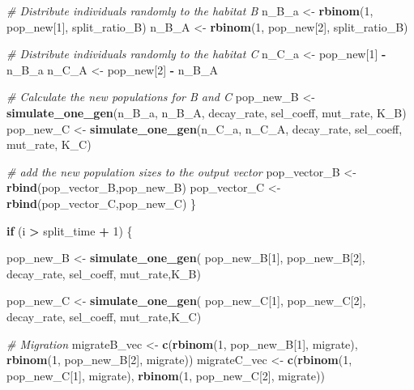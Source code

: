 \documentclass[
]{article}
\newenvironment{Shaded}{\begin{snugshade}}{\end{snugshade}}
\newcommand{\CommentTok}[1]{\textcolor[rgb]{0.56,0.35,0.01}{\textit{#1}}}
\newcommand{\ControlFlowTok}[1]{\textcolor[rgb]{0.13,0.29,0.53}{\textbf{#1}}}
\newcommand{\DecValTok}[1]{\textcolor[rgb]{0.00,0.00,0.81}{#1}}
\newcommand{\FunctionTok}[1]{\textcolor[rgb]{0.13,0.29,0.53}{\textbf{#1}}}
\newcommand{\NormalTok}[1]{#1}
\newcommand{\OtherTok}[1]{\textcolor[rgb]{0.56,0.35,0.01}{#1}}
\newcommand{\SpecialCharTok}[1]{\textcolor[rgb]{0.81,0.36,0.00}{\textbf{#1}}}
\begin{document}
\begin{Shaded}
\begin{Highlighting}[]
      \CommentTok{\# Distribute individuals  randomly to the habitat B}
\NormalTok{      n\_B\_a }\OtherTok{\textless{}{-}} \FunctionTok{rbinom}\NormalTok{(}\DecValTok{1}\NormalTok{, pop\_new[}\DecValTok{1}\NormalTok{], split\_ratio\_B) }
\NormalTok{      n\_B\_A }\OtherTok{\textless{}{-}} \FunctionTok{rbinom}\NormalTok{(}\DecValTok{1}\NormalTok{, pop\_new[}\DecValTok{2}\NormalTok{], split\_ratio\_B)   }
     
      \CommentTok{\# Distribute individuals randomly to the habitat C}
\NormalTok{      n\_C\_a }\OtherTok{\textless{}{-}}\NormalTok{ pop\_new[}\DecValTok{1}\NormalTok{] }\SpecialCharTok{{-}}\NormalTok{ n\_B\_a}
\NormalTok{      n\_C\_A }\OtherTok{\textless{}{-}}\NormalTok{ pop\_new[}\DecValTok{2}\NormalTok{] }\SpecialCharTok{{-}}\NormalTok{ n\_B\_A}
     
      \CommentTok{\# Calculate the new populations for B and C }
\NormalTok{      pop\_new\_B }\OtherTok{\textless{}{-}} \FunctionTok{simulate\_one\_gen}\NormalTok{(n\_B\_a, n\_B\_A, decay\_rate, sel\_coeff, mut\_rate, K\_B)}
\NormalTok{      pop\_new\_C }\OtherTok{\textless{}{-}} \FunctionTok{simulate\_one\_gen}\NormalTok{(n\_C\_a, n\_C\_A, decay\_rate, sel\_coeff, mut\_rate, K\_C)}
      
      \CommentTok{\# add the new population sizes to the output vector}
\NormalTok{      pop\_vector\_B }\OtherTok{\textless{}{-}} \FunctionTok{rbind}\NormalTok{(pop\_vector\_B,pop\_new\_B)}
\NormalTok{      pop\_vector\_C }\OtherTok{\textless{}{-}} \FunctionTok{rbind}\NormalTok{(pop\_vector\_C,pop\_new\_C)}
\NormalTok{    \}}
    
    \ControlFlowTok{if}\NormalTok{ (i }\SpecialCharTok{\textgreater{}}\NormalTok{ split\_time }\SpecialCharTok{+} \DecValTok{1}\NormalTok{) \{}
      
\NormalTok{      pop\_new\_B }\OtherTok{\textless{}{-}} \FunctionTok{simulate\_one\_gen}\NormalTok{(}
\NormalTok{        pop\_new\_B[}\DecValTok{1}\NormalTok{], pop\_new\_B[}\DecValTok{2}\NormalTok{],}
\NormalTok{        decay\_rate, sel\_coeff, mut\_rate,K\_B)}
      
\NormalTok{      pop\_new\_C }\OtherTok{\textless{}{-}} \FunctionTok{simulate\_one\_gen}\NormalTok{(}
\NormalTok{        pop\_new\_C[}\DecValTok{1}\NormalTok{], pop\_new\_C[}\DecValTok{2}\NormalTok{],}
\NormalTok{        decay\_rate, sel\_coeff, mut\_rate,K\_C)}
      
      \CommentTok{\# Migration }
\NormalTok{      migrateB\_vec }\OtherTok{\textless{}{-}} \FunctionTok{c}\NormalTok{(}\FunctionTok{rbinom}\NormalTok{(}\DecValTok{1}\NormalTok{, pop\_new\_B[}\DecValTok{1}\NormalTok{], migrate),}
                        \FunctionTok{rbinom}\NormalTok{(}\DecValTok{1}\NormalTok{, pop\_new\_B[}\DecValTok{2}\NormalTok{], migrate))}
\NormalTok{      migrateC\_vec }\OtherTok{\textless{}{-}} \FunctionTok{c}\NormalTok{(}\FunctionTok{rbinom}\NormalTok{(}\DecValTok{1}\NormalTok{, pop\_new\_C[}\DecValTok{1}\NormalTok{], migrate),}
                        \FunctionTok{rbinom}\NormalTok{(}\DecValTok{1}\NormalTok{, pop\_new\_C[}\DecValTok{2}\NormalTok{], migrate))}
      

\end{Highlighting}
\end{Shaded}
\end{document}
